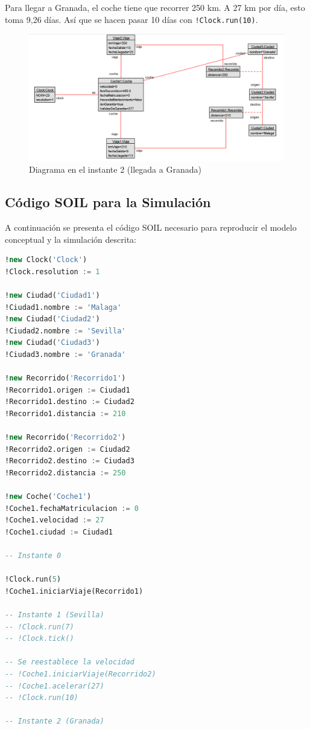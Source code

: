 \documentclass[12pt.a4paper]{article}
\begin{document}
Para llegar a Granada, el coche tiene que recorrer 250 km. A 27 km por día, esto toma 9,26 días. Así que se hacen pasar 10 días con \texttt{!Clock.run(10)}.
\vspace{0.25cm}
\begin{figure}[H]
    \centering
    \includegraphics[width=\linewidth]{fotosInstantes/Instante2.png}
    \caption{Diagrama en el instante 2 (llegada a Granada)}
\end{figure}

\subsection{Código SOIL para la Simulación}
A continuación se presenta el código SOIL necesario para reproducir el modelo conceptual y la simulación descrita:

\begin{lstlisting}[style = useNormal,language=SQL, caption={Codigo SOIL Modelo Objetos}] 
!new Clock('Clock')
!Clock.resolution := 1

!new Ciudad('Ciudad1')
!Ciudad1.nombre := 'Malaga'
!new Ciudad('Ciudad2')
!Ciudad2.nombre := 'Sevilla'
!new Ciudad('Ciudad3')
!Ciudad3.nombre := 'Granada'

!new Recorrido('Recorrido1')
!Recorrido1.origen := Ciudad1
!Recorrido1.destino := Ciudad2
!Recorrido1.distancia := 210

!new Recorrido('Recorrido2')
!Recorrido2.origen := Ciudad2
!Recorrido2.destino := Ciudad3
!Recorrido2.distancia := 250

!new Coche('Coche1')
!Coche1.fechaMatriculacion := 0
!Coche1.velocidad := 27
!Coche1.ciudad := Ciudad1

-- Instante 0

!Clock.run(5)
!Coche1.iniciarViaje(Recorrido1)

-- Instante 1 (Sevilla)
-- !Clock.run(7)
-- !Clock.tick()

-- Se reestablece la velocidad
-- !Coche1.iniciarViaje(Recorrido2)
-- !Coche1.acelerar(27)
-- !Clock.run(10)

-- Instante 2 (Granada)

\end{lstlisting}
\end{document}
